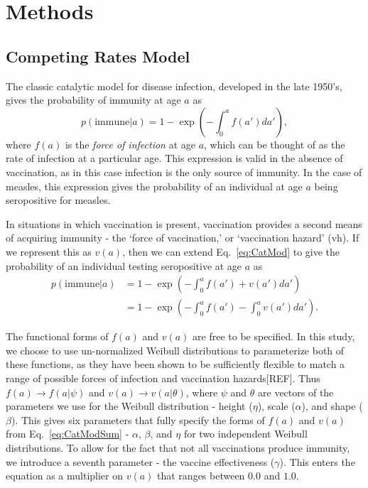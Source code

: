 \documentclass[nofootinbib,aps,pre,twocolumn,superscriptaddress,showkeys,showpacs]{revtex4-1}
\begin{document}
\section{Methods \label{sec:Methods}}
\subsection{Competing Rates Model \label{subsec:CompetingRates}}
The classic catalytic model for disease infection, developed in the late 1950's, gives the probability of immunity at age $a$ as
\begin{equation}
p(\mathrm{immune}|a) = 1 - \exp\left(-\int_0^a f(a') da'\right),
\label{eq:CatMod}
\end{equation}
where $f(a)$ is the \emph{force of infection} at age $a$, which can be thought of as the rate of infection at a particular age. This expression is valid in the absence of vaccination, as in this case infection is the only source of immunity. In the case of measles, this expression gives the probability of an individual at age $a$ being seropositive for measles.

In situations in which vaccination is present, vaccination provides a second means of acquiring immunity - the `force of vaccination,' or `vaccination hazard' (vh). If we represent this as $v(a)$, then we can extend Eq.~\ref{eq:CatMod} to give the probability of an individual testing seropositive at age $a$ as
\begin{align}
p(\mathrm{immune}|a)  &= 1 - \exp\left( - \int_0^a f(a') + v(a') da'\right) \nonumber \\ 
&=1 - \exp\left(-\int_0^a f(a') - \int_0^a v(a') da'\right).
\label{eq:CatModSum}
\end{align}

The functional forms of $f(a)$ and $v(a)$ are free to be specified. In this study, we choose to use un-normalized Weibull distributions to parameterize both of these functions, as they have been shown to be sufficiently flexible to match a range of possible forces of infection and vaccination hazards[REF]. Thus $f(a) \rightarrow f(a|\mathbb{\psi})$ and $v(a) \rightarrow v(a|\mathbb{\theta})$, where $\mathbb{\psi}$ and $\mathbb{\theta}$ are vectors of the parameters we use for the Weibull distribution - height ($\eta$), scale ($\alpha$), and shape ($\beta$). This gives six parameters that fully specify the forms of $f(a)$ and $v(a)$ from Eq.~\ref{eq:CatModSum} - $\alpha$, $\beta$, and $\eta$ for two independent Weibull distributions. To allow for the fact that not all vaccinations produce immunity, we introduce a seventh parameter - the vaccine effectiveness ($\gamma$). This enters the equation as a multiplier on $v(a)$ that ranges between $0.0$ and $1.0$.
\end{document}
